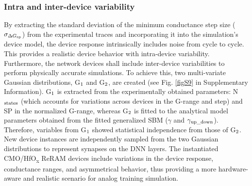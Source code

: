 \subsubsection{Intra and inter-device variability}
By extracting the standard deviation of the minimum conductance step size ($\sigma_{\Delta G_{\rm sp}}$) from the experimental traces and incorporating it into the simulation's device model, the device response intrinsically includes noise from cycle to cycle. This provides a realistic device behavior with intra-device variability. Furthermore, the network devices shall include inter-device variabilities to perform physically accurate simulations. To achieve this, two multi-variate Gaussian distributions, G$_{\rm 1}$ and G$_{\rm 2}$, are created (see Fig. \ref{figS9} in Supplementary Information). G$_{\rm 1}$ is extracted from the experimentally obtained parameters: N$_{\rm states}$ (which accounts for variations across devices in the G-range and step) and SP in the normalized G-range, whereas G$_{\rm 2}$ is fitted to the analytical model parameters obtained from the fitted generalized SBM ($\gamma$ and $\gamma_{\rm up\_down}$). Therefore, variables from G$_{\rm 1}$ showed statistical independence from those of G$_{\rm 2}$. New device instances are independently sampled from the two Gaussian distributions to represent synapses on the DNN layers. The instantiated CMO/HfO\textsubscript{\textnormal{x}} ReRAM devices include variations in the device response, conductance ranges, and asymmetrical behavior, thus providing a more hardware-aware and realistic scenario for analog training simulation. 